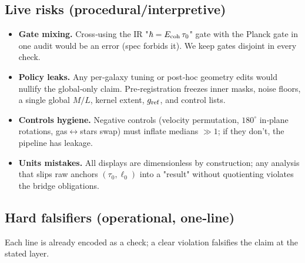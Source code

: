 \documentclass[11pt]{article}
\begin{document}
\subsection{Live risks (procedural/interpretive)}
\begin{itemize}
  \item \textbf{Gate mixing.} Cross‑using the IR "$\hbar=E_{\rm coh}\,\tau_0$" gate with the Planck gate in one audit would be an error (spec forbids it). We keep gates disjoint in every check.
  \item \textbf{Policy leaks.} Any per‑galaxy tuning or post‑hoc geometry edits would nullify the global‑only claim. Pre‑registration freezes inner masks, noise floors, a single global $M/L$, kernel extent, $g_{\rm ref}$, and control lists.
  \item \textbf{Controls hygiene.} Negative controls (velocity permutation, $180^\circ$ in‑plane rotations, gas$\leftrightarrow$stars swap) must inflate medians $\gg 1$; if they don't, the pipeline has leakage.
  \item \textbf{Units mistakes.} All displays are dimensionless by construction; any analysis that slips raw anchors $(\tau_0,\ell_0)$ into a "result" without quotienting violates the bridge obligations.
\end{itemize}

\subsection{Hard falsifiers (operational, one‑line)}
Each line is already encoded as a check; a clear violation falsifies the claim at the stated layer.
\end{document}
